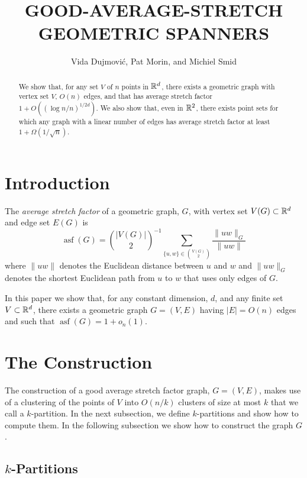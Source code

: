 \documentclass{patmorin}
\title{\MakeUppercase{Good-Average-Stretch Geometric Spanners}}
\author{Vida Dujmovi\'c, Pat Morin, and Michiel Smid}
\DeclareMathOperator{\asf}{asf}
\begin{document}
\begin{titlepage}
\maketitle

\begin{abstract}
  We show that, for any set $V$ of $n$ points in $\mathbb{R}^d$, there exists
  a geometric graph with vertex set $V$, $O(n)$ edges, and that has
  average stretch factor $1+ O((\log n/n)^{1/2d})$.
  We also show that, even in $\mathbb{R}^2$, there exists point sets for which
  any graph with a linear number of edges has average stretch factor
  at least $1+\Omega(1/\sqrt{n})$.
\end{abstract}

\end{titlepage}

\section{Introduction}

The \emph{average stretch factor} of a geometric graph, $G$, with vertex
set $V(G)\subset \mathbb{R}^d$ and edge set $E(G)$ is
\[
    \asf(G) = \binom{|V(G)|}{2}^{-1}\sum_{\{u,w\}\in\binom{V(G)}{2}}\frac{\|uw\|_G}{\|uw\|}
\]
where $\|uw\|$ denotes the Euclidean distance between $u$ and $w$
and $\|uw\|_G$ denotes the shortest Euclidean path from $u$ to $w$
that uses only edges of $G$.

In this paper we show that, for any constant dimension, $d$, and any
finite set $V\subset \mathbb{R}^d$, there exists a geometric graph $G=(V,E)$
having $|E|=O(n)$ edges and such that $\asf(G)=1+o_n(1)$.

\section{The Construction}

The construction of a good average stretch factor graph, $G=(V,E)$,
makes use of a clustering of the points of $V$ into $O(n/k)$ clusters of
size at most $k$ that we call a $k$-partition.  In the next subsection,
we define $k$-partitions and show how to compute them.  In the following
subsection we show how to construct the graph $G$.

\subsection{$k$-Partitions}
\end{document}
